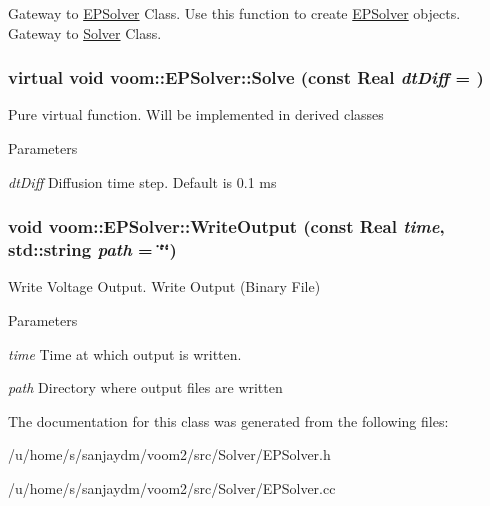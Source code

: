 Gateway to \hyperlink{classvoom_1_1_e_p_solver}{EPSolver} Class. Use this function to create \hyperlink{classvoom_1_1_e_p_solver}{EPSolver} objects. Gateway to \hyperlink{classvoom_1_1_solver}{Solver} Class. \hypertarget{classvoom_1_1_e_p_solver_a4eedcdb113d7c15df7b23dd69dc46e0e}{
\subsubsection[{Solve}]{\setlength{\rightskip}{0pt plus 5cm}virtual void voom::EPSolver::Solve (const Real {\em dtDiff} = {})}}
\label{classvoom_1_1_e_p_solver_a4eedcdb113d7c15df7b23dd69dc46e0e}
Pure virtual function. Will be implemented in derived classes 
\begin{DoxyParams}{Parameters}
\item[{\em dtDiff}]Diffusion time step. Default is 0.1 ms \end{DoxyParams}
\hypertarget{classvoom_1_1_e_p_solver_a22722e9e010bbf7f3eff3bddfac65d26}{
\subsubsection[{WriteOutput}]{\setlength{\rightskip}{0pt plus 5cm}void voom::EPSolver::WriteOutput (const Real {\em time}, \/  std::string {\em path} = {\ttfamily \char`\"{}\char`\"{}})}}
\label{classvoom_1_1_e_p_solver_a22722e9e010bbf7f3eff3bddfac65d26}


Write Voltage Output. Write Output (Binary File) 
\begin{DoxyParams}{Parameters}
\item[{\em time}]Time at which output is written. \item[{\em path}]Directory where output files are written \end{DoxyParams}


The documentation for this class was generated from the following files:\begin{DoxyCompactItemize}
\item 
/u/home/s/sanjaydm/voom2/src/Solver/EPSolver.h\item 
/u/home/s/sanjaydm/voom2/src/Solver/EPSolver.cc\end{DoxyCompactItemize}

